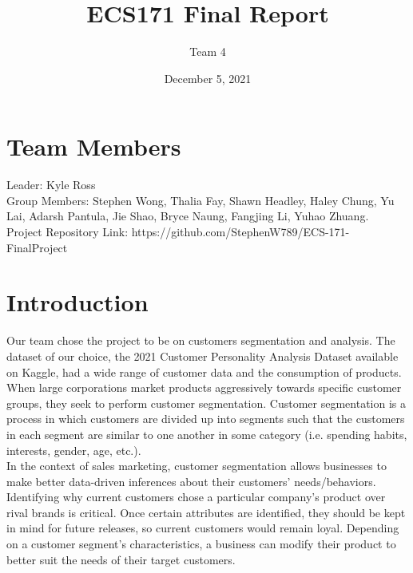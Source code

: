 \documentclass[12pt]{article}
\title{ECS171 Final Report}
\author{Team 4}
\date{December 5, 2021}
\begin{document}
\maketitle

\newcommand{\CVItemListStart}{\begin{itemize}}
\newcommand{\CVItemListEnd}{\end{itemize}\vspace{-5pt}}
\newcommand{\TimelineStart}{\begin{itemize}}
\newcommand{\TimelineEnd}{\end{itemize}\vspace{-5pt}}

\section{Team Members}
Leader: Kyle Ross\\
Group Members: Stephen Wong, Thalia Fay, Shawn Headley, Haley Chung, Yu Lai, Adarsh Pantula, Jie Shao, Bryce Naung, Fangjing Li, Yuhao Zhuang.\\

\noindent Project Repository Link: https://github.com/StephenW789/ECS-171-FinalProject
\section{Introduction}
Our team chose the project to be on customers segmentation and analysis. The dataset of our choice, the 2021 Customer Personality Analysis Dataset available on Kaggle, had a wide range of customer data and the consumption of products.\\

\noindent When large corporations market products aggressively towards specific customer groups, they seek to perform customer segmentation. Customer segmentation is a process in which customers are divided up into segments such that the customers in each segment are similar to one another in some category (i.e. spending habits, interests, gender, age, etc.). \\

\noindent In the context of sales marketing, customer segmentation allows businesses to make better data-driven inferences about their customers’ needs/behaviors. Identifying why current customers chose a particular company's product over rival brands is critical. Once certain attributes are identified, they should be kept in mind for future releases, so current customers would remain loyal. Depending on a customer segment's characteristics, a business can modify their product to better suit the needs of their target customers.\\
\end{document}
